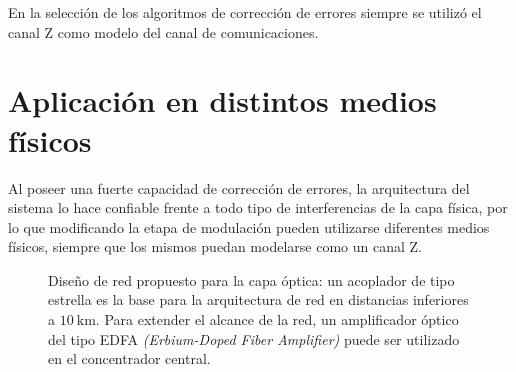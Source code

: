 En la selección de los algoritmos de corrección de errores siempre se utilizó el canal Z como modelo del canal de comunicaciones. %

\section{Aplicación en distintos medios físicos}
Al poseer una fuerte capacidad de corrección de errores, la arquitectura del sistema lo hace confiable frente a todo tipo de interferencias de la capa física, por lo que modificando la etapa de modulación pueden utilizarse diferentes medios físicos, siempre que los mismos puedan modelarse como un canal Z.
\begin{figure}[t]
  \centering
    \qquad
    \caption{Diseño de red propuesto para la capa óptica: un acoplador de tipo estrella es la base para la arquitectura de red en distancias inferiores a $10~\mathrm{km}$. Para extender el alcance de la red, un amplificador óptico del tipo EDFA \textit{(Erbium-Doped Fiber Amplifier)} puede ser utilizado en el concentrador central.}
    \label{arch:fig1}
\end{figure}

